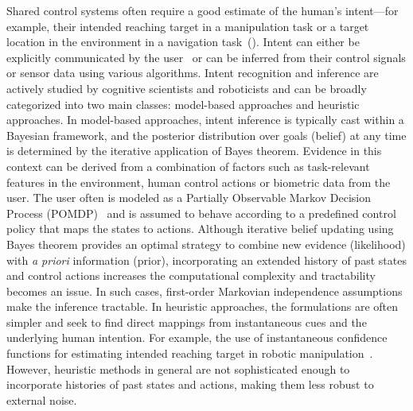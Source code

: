 Shared control systems often require a good estimate of the human's intent---for example, their intended reaching target in a manipulation task or a target location in the environment in a navigation task~(\citep{liu2016goal}). Intent can either be explicitly communicated by the user~\citep{choi2008laser} or can be inferred from their control signals or sensor data using various algorithms. Intent recognition and inference are actively studied by cognitive scientists and roboticists and can be broadly categorized into two main classes: model-based approaches and heuristic approaches. In model-based approaches, intent inference is typically cast within a Bayesian framework, and the posterior distribution over goals (belief) at any time is determined by the iterative application of Bayes theorem. Evidence in this context can be derived from a combination of factors such as task-relevant features in the environment, human control actions or biometric data from the user. The user often is modeled as a Partially Observable Markov Decision Process (POMDP)~\citep{taha2011pomdp} and is assumed to behave according to a predefined control policy that maps the states to actions. Although iterative belief updating using Bayes theorem provides an optimal strategy to combine new evidence (likelihood) with \textit{a priori} information (prior), incorporating an extended history of past states and control actions increases the computational complexity and tractability becomes an issue. In such cases, first-order Markovian independence assumptions make the inference tractable. In heuristic approaches, the formulations are often simpler and seek to find direct mappings from instantaneous cues and the underlying human intention. For example, the use of instantaneous confidence functions for estimating intended reaching target in robotic manipulation~\citep{dragan2012assistive, gopinath2017human}.  However, heuristic methods in general are not sophisticated enough to incorporate histories of past states and actions, making them less robust to external noise. 

